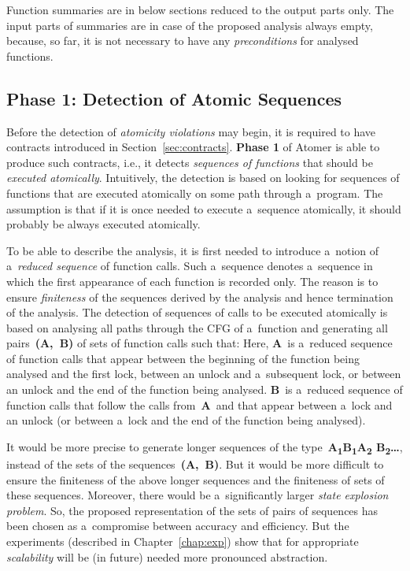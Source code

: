 Function summaries are in below sections reduced to the output parts only.
The input parts of summaries are in case of the proposed analysis always 
empty, because, so far, it is not necessary to have any \emph{preconditions}
for analysed functions.


\newpage
\subsection{Phase 1: Detection of Atomic Sequences}
\label{sec:designPhase1}

Before the detection of \emph{atomicity violations} may begin, it is 
required to have contracts introduced in Section~\ref{sec:contracts}.
\textbf{Phase 1} of Atomer is able to produce such contracts, i.e., 
it detects \emph{sequences of functions} that should be \emph{executed
atomically}. Intuitively, the detection is based on looking for sequences 
of functions that are executed atomically on some path through
a~program. The assumption is that if it is once needed to execute
a~sequence atomically, it should probably be always executed atomically.

To be able to describe the analysis, it is first needed to introduce
a~notion of a~\emph{reduced sequence} of function calls. Such a~sequence
denotes a~sequence in which the first appearance of each function is 
recorded only. The reason is to ensure \emph{finiteness} of the sequences 
derived by the analysis and hence termination of the analysis. The detection 
of sequences of calls to be executed atomically is based on analysing all 
paths through the CFG of a~function and generating all pairs~\textbf{(A,~B)} 
of sets of function calls such that: Here, \textbf{A}~is a~reduced
sequence of function calls that appear between the beginning of the function
being analysed and the first lock, between an unlock and a~subsequent lock, 
or between an unlock and the end of the function being analysed. \textbf{B}~is
a~reduced sequence of function calls that follow the calls from~\textbf{A}~and
that appear between a~lock and an unlock (or between a~lock and the end of 
the function being analysed).

It would be more precise to generate longer sequences of 
the type~\textbf{A\textsubscript{1}B\textsubscript{1}A\textsubscript{2}%
B\textsubscript{2}\ldots}, instead of the sets of the 
sequences~\textbf{(A,~B)}. But it would be more difficult to ensure the
finiteness of the above longer sequences and the finiteness of sets of 
these sequences. Moreover, there would be a~significantly larger 
\emph{state explosion problem}. So, the proposed representation of the 
sets of pairs of sequences has been chosen as a~compromise between 
accuracy and efficiency. But the experiments (described in 
Chapter~\ref{chap:exp}) show that for appropriate \emph{scalability} will 
be (in future) needed more pronounced abstraction.

